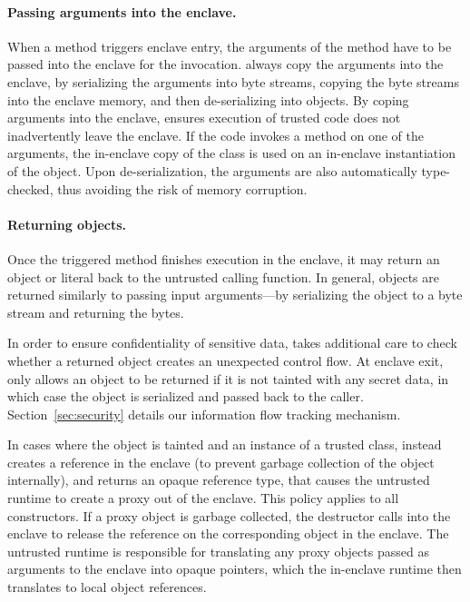 \paragraph{Passing arguments into the enclave.}
When a method triggers enclave entry, the arguments of the method have to be passed into the enclave for the invocation.
\sysname{} always copy the arguments into the enclave,
by serializing the arguments into byte streams,
copying the byte streams into the enclave memory,
and then de-serializing into objects.
By coping arguments into the enclave,
\sysname{} ensures execution of trusted code does not inadvertently leave the enclave.
If the code invokes a method on one of the arguments,
the in-enclave copy of the class is used on an in-enclave instantiation of the object.
Upon de-serialization, the arguments are also automatically type-checked,
thus avoiding the risk of memory corruption.

\paragraph{Returning objects.}
Once the triggered method finishes execution in the enclave,
it may return an object or literal back to the untrusted calling function.
In general, objects are returned similarly to passing input arguments---by serializing the object to a byte stream and returning the bytes.

In order to ensure confidentiality of sensitive data, \sysname{} takes additional care to check
whether a returned object creates an unexpected control flow.
At enclave exit, \sysname{} only allows an object to be returned if it is not tainted with any secret data,
in which case the object is serialized and passed back to the caller.
Section~\ref{sec:security} details our information flow tracking mechanism.

In cases where the object is tainted and an instance of a trusted class,
\sysname{} instead creates a reference in the enclave (to prevent garbage collection of the object internally),
and returns an opaque reference type, that causes the untrusted \sysname{} runtime to create a proxy out of the enclave.
This policy applies to all constructors.
If a proxy object is garbage collected, the destructor calls into the enclave to release the reference on the 
corresponding object in the enclave.
The \sysname{} untrusted runtime is responsible for translating any proxy objects passed as arguments to the enclave into opaque pointers,
which the in-enclave runtime then translates to local object references.

